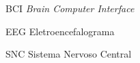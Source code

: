 \begin{siglas}
  \item[BCI] \textit{Brain Computer Interface}
  \item[EEG] Eletroencefalograma
  \item[SNC] Sistema Nervoso Central
  
\end{siglas}
